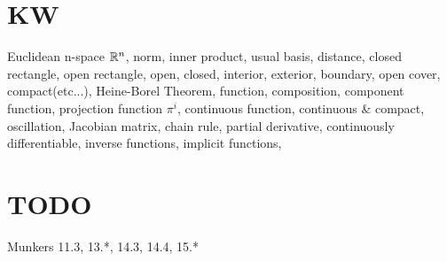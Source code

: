 \section{KW}
Euclidean n-space ${\mathbb R}^n$,
norm,
inner product,
usual basis,
distance,
closed rectangle,
open rectangle,
open,
closed,
interior,
exterior,
boundary,
open cover,
compact(etc...),
Heine-Borel Theorem,
function,
composition,
component function,
projection function $\pi^i$,
continuous function,
continuous \& compact,
oscillation,
Jacobian matrix,
chain rule,
partial derivative,
continuously differentiable,
inverse functions,
implicit functions,


\section{TODO}
Munkers 11.3, 13.*, 14.3, 14.4, 15.*